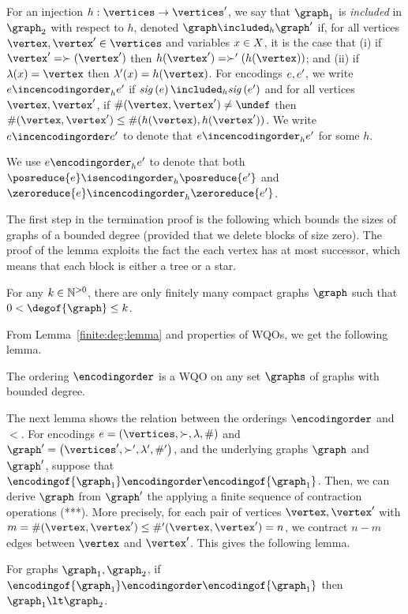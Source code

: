 For an injection $h:\vertices\rightarrow\vertices'$, 
we say that $\graph_1$ is {\it included} in $\graph_2$
with respect to $h$, denoted $\graph\included_h\graph'$
if, for all vertices $\vertex,\vertex'\in\vertices$ and variables $x\in X$,
it is the case that
(i) if $\vertex'=\succ(\vertex')$ then $h(\vertex')=\succ'(h(\vertex))$; and
(ii) if $\labeling(\xvar)=\vertex$ then $\labeling'(\xvar)=h(\vertex)$.
%
%
For encodings $e,e'$, we write $\encoding\incencodingorder_h\encoding'$ if 
$\sigof{\encoding}\included_h\sigof{\encoding'}$ and for all vertices $\vertex,\vertex'$,
if $\cnt(\vertex,\vertex')\neq\undef$ then  $\cnt(\vertex,\vertex')\leq\cnt(h(\vertex),h(\vertex'))$.
%
We write $\encoding\incencodingorder\encoding'$ to denote that
$\encoding\incencodingorder_h\encoding'$ for some $h$.
%


We use $\encoding\encodingorder_h\encoding'$ to denote that both
$\posreduce{\encoding}\isencodingorder_h\posreduce{\encoding'}$
and
$\zeroreduce{\encoding}\incencodingorder_h\zeroreduce{\encoding'}$.




The first step in the termination proof is the following which bounds the
sizes of graphs of a bounded degree (provided that we delete blocks of size zero).
%
The proof of the lemma exploits the fact the each vertex has at most successor, which means that
each block is either a tree or a star.
%
\begin{lemma}
\label{finite:deg:lemma}
For any $k\in{\mathbb N}^{>0}$, there are only finitely many compact graphs $\graph$ 
such that $0<\degof{\graph}\leq k$.
\end{lemma}
%
From Lemma~\ref{finite:deg:lemma} and properties of WQOs,
we get the following lemma.
%
\begin{lemma}
\label{encoding:WQO:lemma}
The ordering $\encodingorder$ is a WQO on any set $\graphs$ of graphs with bounded degree.
\end{lemma}
%
The next lemma shows the relation between the orderings $\encodingorder$  and
$\lt$.
%
For encodings $\encoding=\tuple{\vertices,\succ,\labeling,\cnt}$ and
$\graph'=\tuple{\vertices',\succ',\labeling',\cnt'}$, and the
underlying graphs $\graph$ and $\graph'$,
suppose that $\encodingof{\graph_1}\encodingorder\encodingof{\graph_1}$.
%
Then, we can derive $\graph$ from $\graph'$ the applying a finite sequence of contraction
operations (***).
%
More precisely, for each pair of vertices $\vertex,\vertex'$ with
$m=\cnt(\vertex,\vertex')\leq\cnt'(\vertex,\vertex')=n$, we contract
$n-m$ edges between $\vertex$ and $\vertex'$.
%
This gives the following lemma.
%
\begin{lemma}
\label{encoding:implication:lemma}
For graphs $\graph_1,\graph_2$, if 
$\encodingof{\graph_1}\encodingorder\encodingof{\graph_1}$ then
$\graph_1\lt\graph_2$.
\end{lemma}

